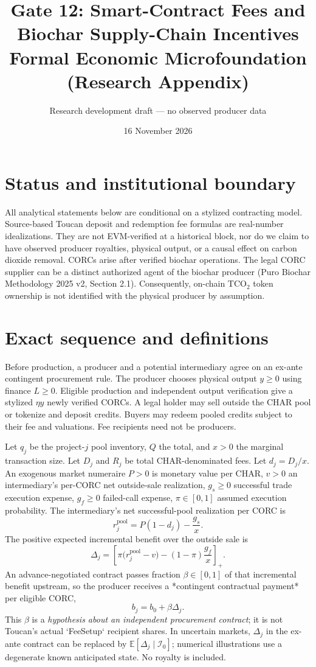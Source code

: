 \documentclass[11pt]{article}
\title{Gate 12: Smart-Contract Fees and Biochar Supply-Chain Incentives\\\large Formal Economic Microfoundation (Research Appendix)}
\author{Research development draft --- no observed producer data}
\date{16 November 2026}
\newcommand{\pos}[1]{\left[#1\right]_+}
\begin{document}
\maketitle
\section{Status and institutional boundary}
All analytical statements below are conditional on a stylized contracting model. Source-based Toucan deposit and redemption fee formulas are real-number idealizations. They are not EVM-verified at a historical block, nor do we claim to have observed producer royalties, physical output, or a causal effect on carbon dioxide removal. CORCs arise after verified biochar operations. The legal CORC supplier can be a distinct authorized agent of the biochar producer (Puro Biochar Methodology 2025 v2, Section 2.1). Consequently, on-chain TCO$_2$ token ownership is not identified with the physical producer by assumption.

\section{Exact sequence and definitions}
Before production, a producer and a potential intermediary agree on an ex-ante contingent procurement rule. The producer chooses physical output $y\geq 0$ using finance $L\geq0$. Eligible production and independent output verification give a stylized $\eta y$ newly verified CORCs. A legal holder may sell outside the CHAR pool or tokenize and deposit credits. Buyers may redeem pooled credits subject to their fee and valuations. Fee recipients need not be producers.

Let $q_j$ be the project-$j$ pool inventory, $Q$ the total, and $x>0$ the marginal transaction size. Let $D_j$ and $R_j$ be total CHAR-denominated fees. Let $d_j=D_j/x$. An exogenous market numeraire $P>0$ is monetary value per CHAR, $v>0$ an intermediary's per-CORC net outside-sale realization, $g_s\geq0$ successful trade execution expense, $g_f\geq0$ failed-call expense, $\pi\in[0,1]$ assumed execution probability. The intermediary's net successful-pool realization per CORC is
\begin{equation}
 r_j^{\mathrm{pool}}=P(1-d_j)-\frac{g_s}{x}.
\end{equation}
The positive expected incremental benefit over the outside sale is
\begin{equation}
 \Delta_j=\pos{\pi\big(r_j^{\mathrm{pool}}-v\big)-(1-\pi)\frac{g_f}{x}}.
\end{equation}
An advance-negotiated contract passes fraction $\beta\in[0,1]$ of that incremental benefit upstream, so the producer receives a *contingent contractual payment* per eligible CORC,
\begin{equation}
 b_j=b_0+\beta\Delta_j.
\end{equation}
This $\beta$ is a \emph{hypothesis about an independent procurement contract}; it is not Toucan's actual `FeeSetup` recipient shares. In uncertain markets, $\Delta_j$ in the ex-ante contract can be replaced by $\mathbb E[\Delta_j\mid \mathcal I_0]$; numerical illustrations use a degenerate known anticipated state. No royalty is included.
\end{document}
